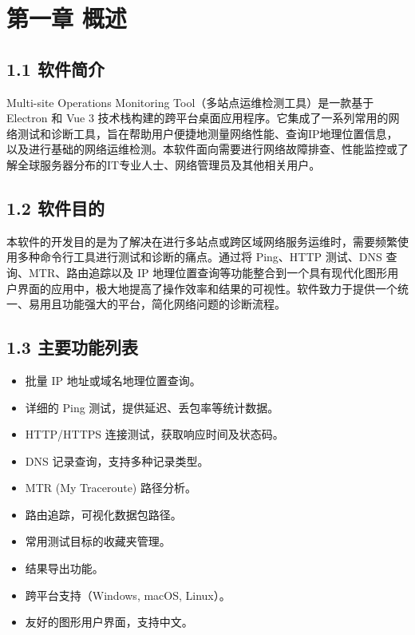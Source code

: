 \documentclass{article}
\begin{document}
\clearpage %
\setcounter{page}{1}

\section*{第一章 概述}

\subsection*{1.1 软件简介}

Multi-site Operations Monitoring Tool（多站点运维检测工具）是一款基于 Electron 和 Vue 3 技术栈构建的跨平台桌面应用程序。它集成了一系列常用的网络测试和诊断工具，旨在帮助用户便捷地测量网络性能、查询IP地理位置信息，以及进行基础的网络运维检测。本软件面向需要进行网络故障排查、性能监控或了解全球服务器分布的IT专业人士、网络管理员及其他相关用户。

\subsection*{1.2 软件目的}

本软件的开发目的是为了解决在进行多站点或跨区域网络服务运维时，需要频繁使用多种命令行工具进行测试和诊断的痛点。通过将 Ping、HTTP 测试、DNS 查询、MTR、路由追踪以及 IP 地理位置查询等功能整合到一个具有现代化图形用户界面的应用中，极大地提高了操作效率和结果的可视性。软件致力于提供一个统一、易用且功能强大的平台，简化网络问题的诊断流程。

\subsection*{1.3 主要功能列表}

\begin{itemize}
    \item 批量 IP 地址或域名地理位置查询。
    \item 详细的 Ping 测试，提供延迟、丢包率等统计数据。
    \item HTTP/HTTPS 连接测试，获取响应时间及状态码。
    \item DNS 记录查询，支持多种记录类型。
    \item MTR (My Traceroute) 路径分析。
    \item 路由追踪，可视化数据包路径。
    \item 常用测试目标的收藏夹管理。
    \item 结果导出功能。
    \item 跨平台支持（Windows, macOS, Linux）。
    \item 友好的图形用户界面，支持中文。
\end{itemize}
\end{document}
